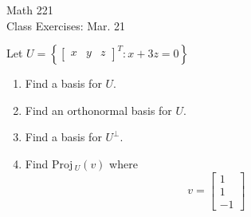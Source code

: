\documentclass[11pt]{article}
\newcommand{\Proj}{\textrm{Proj}\,}
\begin{document}
\begin{center}
\Large
\rm{Math 221}
\\
\rm{Class Exercises:  Mar. 21}
\\
\end{center}
\vspace{0.2in}

Let $U=\left\{\left[ \begin{array}{ccc} x & y & z   \end{array}\right]^T: x+3z=0\right\}$

\begin{enumerate}
	\item {Find a basis for $U$.}
	\item {Find an orthonormal basis for $U$.}
	\item {Find a basis for $U^{\perp}$.}
	\item {Find $\Proj_U(v)$ where
	\begin{displaymath}
	v = \left[ \begin{array}{r} 1 \\ 1 \\ -1   \end{array}\right]
	\end{displaymath}}
\end{enumerate}
\end{document}
